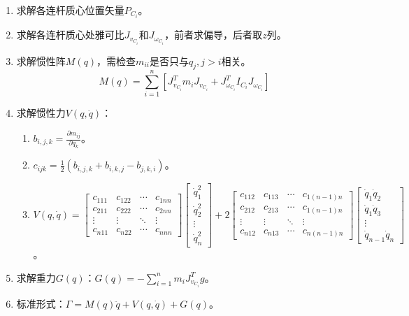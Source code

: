 \documentclass[
12pt, %
a4paper, 
oneside, %
headinclude,footinclude, %
]{scrartcl}
\begin{document}
\begin{enumerate}
\item 求解各连杆质心位置矢量$ P_{C_i} $。
\item 求解各连杆质心处雅可比$ J_{v_{C_i}} $和$ J_{\omega_{C_i}} $，前者求偏导，后者取$ z $列。
\item 求解惯性阵$ M(q) $，需检查$ m_{ii} $是否只与$ q_j,j > i $相关。
$$ M(q) = \sum_{i = 1}^{n}[J_{v_{C_i}}^T m_i J_{v_{C_i}} + J_{\omega_{C_i}}^T I_{C_i} J_{\omega_{C_i}}] $$
\item 求解惯性力$ V(q,\dot{q}) $：
\begin{enumerate}
\item $ b_{i,j,k} = \frac{\partial m_{ij}}{\partial q_k} $。
\item $ c_{ijk} = \frac{1}{2}(b_{i,j,k} + b_{i,k,j} - b_{j,k,i}) $。
\item 
$
V(q,\dot{q}) = 
\begin{bmatrix} c_{111} & c_{122} & \cdots & c_{1nn} \\ c_{211} & c_{222} & \cdots & c_{2nn} \\ \vdots & \vdots & \ddots & \vdots \\ c_{n11} & c_{n22} & \cdots & c_{nnn} \end{bmatrix} \begin{bmatrix} \dot{q}_1^2 \\ \dot{q}_2^2 \\ \vdots \\ \dot{q}_n^2 \end{bmatrix}
+ 2\begin{bmatrix} c_{112} & c_{113} & \cdots & c_{1(n - 1)n} \\ c_{212} & c_{213} & \cdots & c_{1(n - 1)n} \\ \vdots & \vdots & \ddots & \vdots \\ c_{n12} & c_{n13} & \cdots & c_{n(n - 1)n} \end{bmatrix} \begin{bmatrix} \dot{q}_1\dot{q}_2 \\ \dot{q}_1\dot{q}_3 \\ \vdots \\ \dot{q}_{n - 1}\dot{q}_n \end{bmatrix}
$。
\end{enumerate}
\item 求解重力$ G(q) $：$ G(q) = -\sum_{i = 1}^{n} m_i J_{v_{C_i}}^T g $。
\item 标准形式：$ \Gamma = M(q)\ddot{q} + V(q, \dot{q}) + G(q) $。
\end{enumerate}
\end{document}
